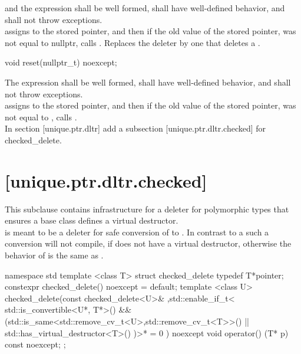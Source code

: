 \documentclass[ebook,11pt,article]{memoir}
\begin{document}
\pnum
\requires {} and the expression  shall be well formed, shall have well-defined behavior, and shall not throw exceptions.
\\
\pnum
\effects assigns  to the stored pointer, and then if the old value of the stored pointer,  was not equal to nullptr, calls . Replaces the  deleter by one that deletes a .
\\

\begin{itemdecl}
void reset(nullptr_t) noexcept;
\end{itemdecl}

\pnum
\requires The expression  shall be well formed, shall have well-defined behavior, and shall not throw exceptions.
\\
\pnum
\effects assigns  to the stored pointer, and then if the old value of the stored pointer,  was not equal to , calls . 
\\



In section [unique.ptr.dltr] add a subsection [unique.ptr.dltr.checked] for checked_delete.
\\

\section{ [unique.ptr.dltr.checked]}
\pnum
This subclause contains infrastructure for a deleter for polymorphic types that ensures a base class defines a virtual destructor.\\

\pnum
\enternote
{} is meant to be a deleter for safe conversion of  to . In contrast to a  such a conversion will not compile, if  does not have a virtual destructor, otherwise the behavior of  is the same as .
\exitnote

\begin{codeblock}
namespace std{
template <class T>
struct  checked_delete
{
	typedef T*pointer;
    constexpr checked_delete() noexcept = default;
    template <class U>
         checked_delete(const checked_delete<U>&
             ,std::enable_if_t<
             	 std::is_convertible<U*, T*>{}() 
             	 && (std::is_same<std::remove_cv_t<U>,std::remove_cv_t<T>>{}()
             	     || std::has_virtual_destructor<T>{}()
            	  )>* = 0
             	  ) noexcept {}
     void operator() (T* p) const noexcept;
};
}
\end{codeblock}
\end{document}

